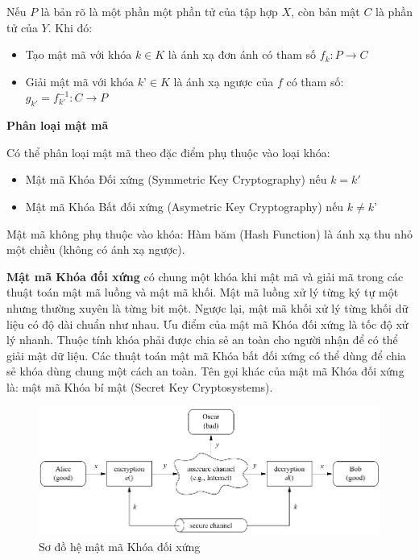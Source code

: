 Nếu $P$ là bản rõ là một phần một phần tử của tập hợp $X$, còn bản mật $C$ là phần tử của $Y$. Khi đó:

\begin{itemize}
\item Tạo mật mã với khóa $k \in K $ là ánh xạ đơn ánh có tham số $f_k: P \to C$
\item Giải mật mã với khóa $k’ \in K $ là ánh xạ ngược của $f$ có tham số: $ g_{k'} = f_{k'}^{-1} : C \to P $
\end{itemize}

\textbf{Phân loại mật mã}

Có thể phân loại mật mã theo đặc điểm phụ thuộc vào loại khóa:

\begin{itemize}
\item Mật mã Khóa Đối xứng (Symmetric Key Cryptography) nếu $k=k'$
\item Mật mã Khóa Bất đối xứng (Asymetric Key Cryptography) nếu $k ≠ k’$
\end{itemize}

Mật mã không phụ thuộc vào khóa: Hàm băm (Hash Function) là ánh xạ thu nhỏ một chiều (không có ánh xạ ngược).

\textbf{Mật mã Khóa đối xứng} có chung một khóa khi mật mã và giải mã trong các thuật toán mật mã luồng và mật mã khối. Mật mã luồng xử lý từng ký tự một nhưng thường xuyên là từng bit một. Ngược lại, mật mã khối xử lý từng khối dữ liệu có độ dài chuẩn như nhau. Ưu điểm của mật mã Khóa đối xứng là tốc độ xử lý nhanh. Thuộc tính khóa phải được chia sẻ an toàn cho người nhận để có thể giải mật dữ liệu. Các thuật toán mật mã Khóa bất đối xứng có thể dùng để chia sẻ khóa dùng chung một cách an toàn. Tên gọi khác của mật mã Khóa đối xứng là: mật mã Khóa bí mật (Secret Key Cryptosystems).

\begin{figure}[htbp]
\centering
\includegraphics[width=.9\linewidth]{img/sym_alg.png}
\caption{Sơ đồ hệ mật mã Khóa đối xứng}
\label{fig:sym_alg}
\end{figure}

